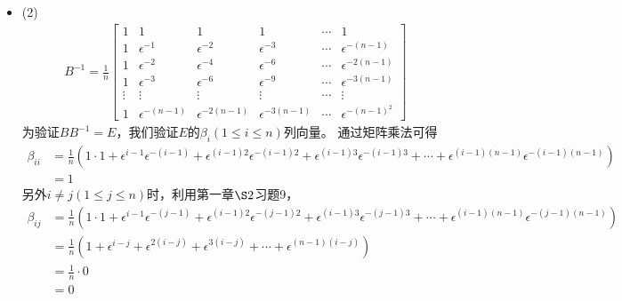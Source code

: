 \documentclass{article}
\begin{document}
\begin{itemize}
  \item (2)
        \begin{align*}
          B^{-1} = \frac{1}{n}\begin{bmatrix}
                                1      & 1                   & 1                    & 1                    & \cdots & 1                     \\
                                1      & \epsilon^{-1}       & \epsilon^{-2}        & \epsilon^{-3}        & \cdots & \epsilon^{-(n - 1)}   \\
                                1      & \epsilon^{-2}       & \epsilon^{-4}        & \epsilon^{-6}        & \cdots & \epsilon^{-2(n-1)}    \\
                                1      & \epsilon^{-3}       & \epsilon^{-6}        & \epsilon^{-9}        & \cdots & \epsilon^{-3(n-1)}    \\
                                \vdots & \vdots              & \vdots               & \vdots               & \cdots & \vdots                \\
                                1      & \epsilon^{-(n - 1)} & \epsilon^{-2(n - 1)} & \epsilon^{-3(n - 1)} & \cdots & \epsilon^{-(n - 1)^2}
                              \end{bmatrix}
        \end{align*}
        为验证$BB^{-1} = E$，我们验证$E$的$\beta_i(1 \leq i \leq n)$列向量。
        通过矩阵乘法可得
        \begin{align*}
          \beta_{ii} & = \frac{1}{n} (1 \cdot 1
          + \epsilon^{i-1} \epsilon^{-(i - 1)}
          + \epsilon^{(i-1)2} \epsilon^{-(i-1)2}
          + \epsilon^{(i-1)3} \epsilon^{-(i-1)3}
          + \cdots + \epsilon^{(i-1)(n - 1)} \epsilon^{-(i-1)(n - 1)}) \\
                     & = 1
        \end{align*}
        另外$i \neq j (1 \leq j \leq n)$时，利用第一章$\S 2$习题9，
        \begin{align*}
          \beta_{ij} & = \frac{1}{n} (1 \cdot 1
          + \epsilon^{i-1} \epsilon^{-(j - 1)}
          + \epsilon^{(i-1)2} \epsilon^{-(j-1)2}
          + \epsilon^{(i-1)3} \epsilon^{-(j-1)3}
          + \cdots + \epsilon^{(i-1)(n - 1)} \epsilon^{-(j-1)(n - 1)})                                                                  \\
                     & = \frac{1}{n}(1 + \epsilon^{i-j} + \epsilon^{2(i - j)} + \epsilon^{3(i - j)} + \cdots + \epsilon^{(n-1)(i - j)}) \\
                     & = \frac{1}{n} \cdot 0                                                                                            \\
                     & = 0
        \end{align*}
\end{itemize}
\end{document}
